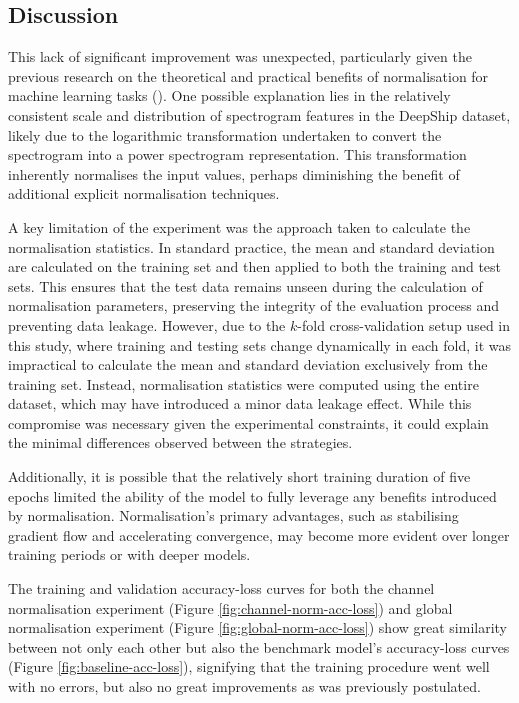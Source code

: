 \subsection{Discussion}

This lack of significant improvement was unexpected, particularly given the previous research on the theoretical and practical benefits of normalisation for machine learning tasks (\cite{chris_kroenke_normalizing_2022, gunes_answer_2020, wu_group_2018, primus_frequency-wise_2023, simic_normalization_2023}). One possible explanation lies in the relatively consistent scale and distribution of spectrogram features in the DeepShip dataset, likely due to the logarithmic transformation undertaken to convert the spectrogram into a power spectrogram representation. This transformation inherently normalises the input values, perhaps diminishing the benefit of additional explicit normalisation techniques.

A key limitation of the experiment was the approach taken to calculate the normalisation statistics. In standard practice, the mean and standard deviation are calculated on the training set and then applied to both the training and test sets. This ensures that the test data remains unseen during the calculation of normalisation parameters, preserving the integrity of the evaluation process and preventing data leakage. However, due to the $k$-fold cross-validation setup used in this study, where training and testing sets change dynamically in each fold, it was impractical to calculate the mean and standard deviation exclusively from the training set. Instead, normalisation statistics were computed using the entire dataset, which may have introduced a minor data leakage effect. While this compromise was necessary given the experimental constraints, it could explain the minimal differences observed between the strategies.

Additionally, it is possible that the relatively short training duration of five epochs limited the ability of the model to fully leverage any benefits introduced by normalisation. Normalisation's primary advantages, such as stabilising gradient flow and accelerating convergence, may become more evident over longer training periods or with deeper models.

The training and validation accuracy-loss curves for both the channel normalisation experiment (Figure \ref{fig:channel-norm-acc-loss}) and global normalisation experiment (Figure \ref{fig:global-norm-acc-loss}) show great similarity between not only each other but also the benchmark model's accuracy-loss curves (Figure \ref{fig:baseline-acc-loss}), signifying that the training procedure went well with no errors, but also no great improvements as was previously postulated.

